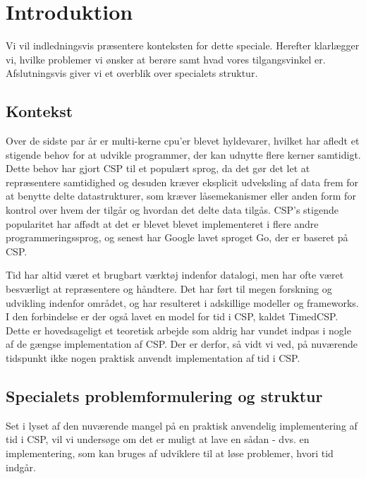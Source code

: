 \chapter{Introduktion}
Vi vil indledningsvis præsentere konteksten for dette speciale. Herefter klarlægger vi, hvilke problemer vi ønsker at berøre samt hvad vores tilgangsvinkel er. Afslutningsvis giver vi et overblik over specialets struktur. 

\section{Kontekst}
Over de sidste par år er multi-kerne cpu'er blevet hyldevarer, hvilket har afledt et stigende behov for at udvikle programmer, der kan udnytte flere kerner samtidigt. Dette behov har gjort CSP til et populært sprog, da det gør det let at repræsentere samtidighed og desuden kræver eksplicit udveksling af data frem for at benytte delte datastrukturer, som kræver låsemekanismer eller anden form for kontrol over hvem der tilgår og hvordan det delte data tilgås. CSP's stigende popularitet har affødt at det er blevet blevet implementeret i flere andre programmeringssprog, og senest har Google lavet sproget Go, der er baseret på CSP. 

Tid har altid været et brugbart værktøj indenfor datalogi, men har ofte været besværligt at repræsentere og håndtere. Det har ført til megen forskning og udvikling indenfor området, og har resulteret i adskillige modeller og frameworks. I den forbindelse er der også lavet en model for tid i CSP, kaldet TimedCSP. Dette er hovedsageligt et teoretisk arbejde som aldrig har vundet indpas i nogle af de gængse implementation af CSP. Der er derfor, så vidt vi ved, på nuværende tidspunkt ikke nogen praktisk anvendt implementation af tid i CSP. 

\section{Specialets problemformulering og struktur}
Set i lyset af den nuværende mangel på en praktisk anvendelig implementering af tid i CSP, vil vi undersøge om det er muligt at lave en sådan - dvs. en implementering, som kan bruges af udviklere til at løse problemer, hvori tid indgår.

